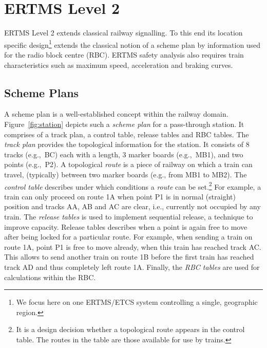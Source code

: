 \section{ERTMS Level 2}


ERTMS Level 2 extends classical railway signalling. To this end its
location specific design\footnote{We focus here on one ERTMS/ETCS
  system controlling a single, geographic region.} extends the
classical notion of a scheme plan by information used for the radio
block centre (RBC). ERTMS safety analysis also requires train
characteristics such as maximum speed, acceleration and braking
curves.

\subsection{Scheme Plans}

A scheme plan is a well-established concept within the railway
domain. Figure~\ref{fig:station} depicts such a \emph{scheme plan} for
a pass-through station. It comprises of a track plan, a control table,
release tables and RBC tables. The \emph{track plan} provides the
topological information for the station. It consists of 8 tracks
(e.g.,\ BC) each with a length, 3 marker boards (e.g.,\ MB1), and two
points (e.g.,\ P2). A topological \emph{route} is a piece of railway
on which a train can travel, (typically) between two marker boards
(e.g., from MB1 to MB2). The {\em control table} describes under which
conditions a \emph{route} can be set.\footnote{It is a design
  decision whether a topological route appears in the control table. The
  routes in the table are those available for use by trains.}  For
example, a train can only proceed on route 1A when point P1 is in
normal (straight) position and tracks AA, AB and AC are clear, i.e.,
currently not occupied by any train. The \emph{release tables} is used
to implement sequential release, a technique to improve
capacity. Release tables describes when a point is again free to move
after being locked for a particular route. For example, when sending a
train on route 1A, point P1 is free to move already, when this train
has reached track AC. This allows to send another train on route 1B
before the first train has reached track AD and thus completely left
route 1A. Finally, the \emph{RBC tables} are used for %
calculations within the RBC.

